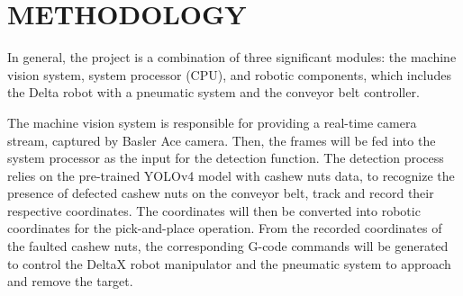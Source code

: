 \documentclass[10pt, letterpaper]{article}
\begin{document}
\section{METHODOLOGY}
    In general, the project is a combination of three significant modules: the machine vision system, system processor (CPU), and robotic components, which includes the Delta robot with a pneumatic system and the conveyor belt controller.\par
    The machine vision system is responsible for providing a real-time camera stream, captured by Basler Ace camera. Then, the frames will be fed into the system processor as the input for the detection function. The detection process relies on the pre-trained YOLOv4 model with cashew nuts data, to recognize the presence of defected cashew nuts on the conveyor belt, track and record their respective coordinates. The coordinates will then be converted into robotic coordinates for the pick-and-place operation. From the recorded coordinates of the faulted cashew nuts, the corresponding G-code commands will be generated to control the DeltaX robot manipulator and the pneumatic system to approach and remove the target.\par
\end{document}
